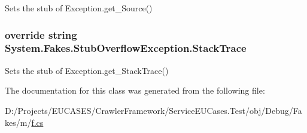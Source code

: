 Sets the stub of Exception.\-get\-\_\-\-Source()

\hypertarget{class_system_1_1_fakes_1_1_stub_overflow_exception_ab371624ced3abd47b55c9008803a454d}{
\subsubsection[{Stack\-Trace}]{\setlength{\rightskip}{0pt plus 5cm}override string System.\-Fakes.\-Stub\-Overflow\-Exception.\-Stack\-Trace\hspace{0.3cm}{\ttfamily [get]}}}\label{class_system_1_1_fakes_1_1_stub_overflow_exception_ab371624ced3abd47b55c9008803a454d}


Sets the stub of Exception.\-get\-\_\-\-Stack\-Trace()



The documentation for this class was generated from the following file\-:\begin{DoxyCompactItemize}
\item 
D\-:/\-Projects/\-E\-U\-C\-A\-S\-E\-S/\-Crawler\-Framework/\-Service\-E\-U\-Cases.\-Test/obj/\-Debug/\-Fakes/m/\hyperlink{m_2f_8cs}{f.\-cs}\end{DoxyCompactItemize}
